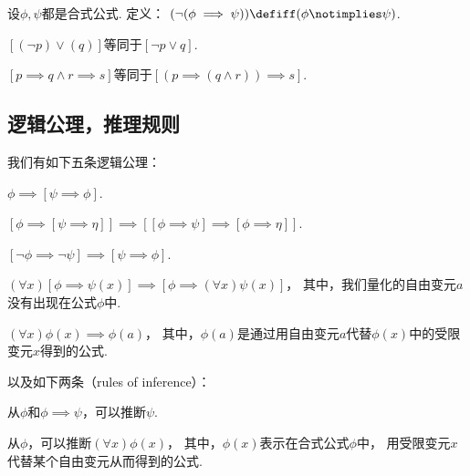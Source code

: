 \begin{definition}
设\(\phi,\psi\)都是合式公式.
定义：
\((\neg(\phi\implies\psi))
\defiff
(\phi\notimplies\psi)\).
\end{definition}

\begin{example}
\([(\neg p) \lor (q)]\)等同于\([\neg p \lor q]\).
\end{example}

\begin{example}
\([p \implies q \land r \implies s]\)等同于\([(p \implies (q \land r)) \implies s]\).
\end{example}

\subsection{逻辑公理，推理规则}
我们有如下五条逻辑公理：
\begin{axiom}
\(\phi \implies [\psi \implies \phi]\).
\end{axiom}
\begin{axiom}
\([\phi \implies [\psi \implies \eta]] \implies [[\phi \implies \psi] \implies [\phi \implies \eta]]\).
\end{axiom}
\begin{axiom}
\([\neg\phi \implies \neg\psi] \implies [\psi \implies \phi]\).
\end{axiom}
\begin{axiom}
\((\forall x)[\phi \implies \psi(x)] \implies [\phi \implies (\forall x) \psi(x)]\)，
其中，我们量化的自由变元\(a\)没有出现在公式\(\phi\)中.
\end{axiom}
\begin{axiom}
\((\forall x) \phi(x) \implies \phi(a)\)，
其中，\(\phi(a)\)是通过用自由变元\(a\)代替\(\phi(x)\)中的受限变元\(x\)得到的公式.
\end{axiom}
以及如下两条（rules of inference）：
\begin{axiom}
从\(\phi\)和\(\phi \implies \psi\)，可以推断\(\psi\).
\end{axiom}
\begin{axiom}
从\(\phi\)，可以推断\((\forall x) \phi(x)\)，
其中，\(\phi(x)\)表示在合式公式\(\phi\)中，
用受限变元\(x\)代替某个自由变元从而得到的公式.
\end{axiom}

